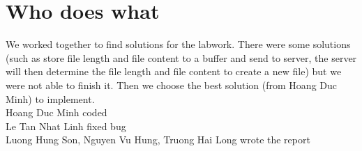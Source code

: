 \documentclass[12pt]{article}
\begin{document}
    \section{Who does what}
    We worked together to find solutions for the labwork. There were some solutions (such as store file length and file content to a buffer and send to server, the server will then determine the file length and file content to create a new file) but we were not able to finish it. Then we choose the best solution (from Hoang Duc Minh) to implement.\\
Hoang Duc Minh coded\\
Le Tan Nhat Linh fixed bug\\
Luong Hung Son, Nguyen Vu Hung, Truong Hai Long wrote the report
\end{document}
